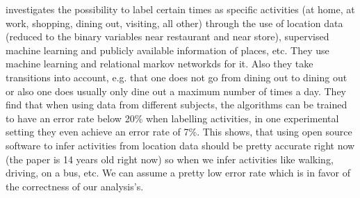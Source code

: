 \parencite{liao2005location} investigates the possibility to label certain times as specific activities (at home, at work, shopping, dining out, visiting, all other) through the use of location data (reduced to the binary variables near restaurant and near store), supervised machine learning and publicly available information of places, etc. They use machine learning and relational markov networkds for it. Also they take transitions into account, e.g. that one does not go from dining out to dining out or also one does usually only dine out a maximum number of times a day. They find that when using data from different subjects, the algorithms can be trained to have an error rate below 20\% when labelling activities, in one experimental setting they even achieve an error rate of 7\%. This shows, that using open source software to infer activities from location data should be pretty accurate right now (the paper is 14 years old right now) so when we infer activities like walking, driving, on a bus, etc. We can assume a pretty low error rate which is in favor of the correctness of our analysis's.


